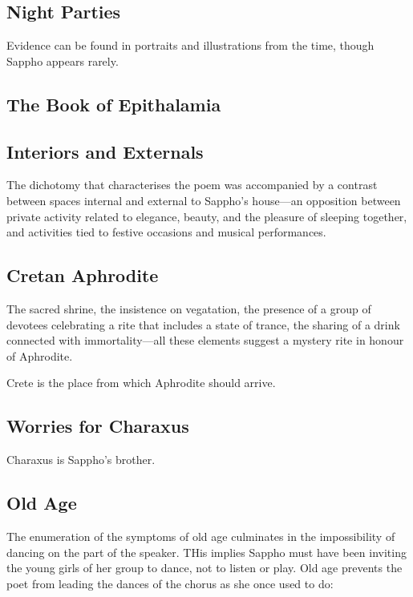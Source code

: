 \subsection{Night Parties}

Evidence can be found in portraits and illustrations from the time, though Sappho appears rarely.

\subsection{The Book of Epithalamia}



\subsection{Interiors and Externals}

The dichotomy that characterises the poem was accompanied by a contrast between spaces internal and external to Sappho's house---an opposition between private activity related to elegance, beauty, and the pleasure of sleeping together, and activities tied to festive occasions and musical performances.

\subsection{Cretan Aphrodite}

The sacred shrine, the insistence on vegatation, the presence of a group of devotees celebrating a rite that includes a state of trance, the sharing of a drink connected with immortality---all these elements suggest a mystery rite in honour of Aphrodite.

Crete is the place from which Aphrodite should arrive.

\subsection{Worries for Charaxus}

Charaxus is Sappho's brother.


\subsection{Old Age}

The enumeration of the symptoms of old age culminates in the impossibility of dancing on the part of the speaker. THis implies Sappho must have been inviting the young girls of her group to dance, not to listen or play. Old age prevents the poet from leading the dances of the chorus as she once used to do:

